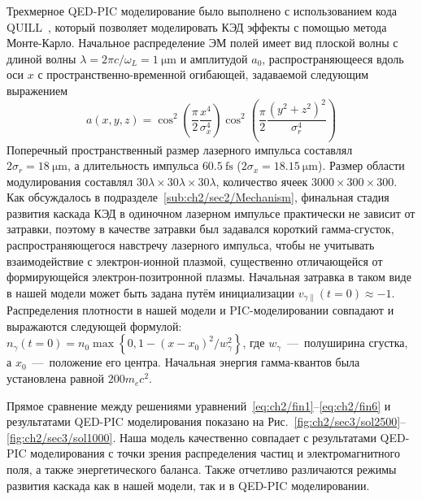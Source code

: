 Трехмерное QED-PIC моделирование было выполнено с использованием кода QUILL~\cite{QUILL}, который позволяет моделировать КЭД эффекты с помощью метода Монте-Карло.
Начальное распределение ЭМ полей имеет вид плоской волны с длиной волны $\lambda=2\pi c/\omega_{L}=\SI{1}{\um}$ и амплитудой $a_0 $, распространяющееся вдоль оси $x$ с пространственно-временной огибающей, задаваемой следующим выражением
\begin{equation}
a(x,y,z) =  \cos^2 \left( \frac{ \pi }{2}   \frac{x^4}{\sigma_x^4 } \right) \cos^2 \left( \frac{ \pi}{2}   \frac{\left( y^2 + z^2 \right)^2}{\sigma_r^4 } \right)
\end{equation}
Поперечный пространственный размер лазерного импульса составлял $2\sigma_r = \SI{18}{\um}$, а длительность импульса $\SI{60.5}{\femto\second}$ ($2\sigma_x = \SI{18.15}{\um}$).
Размер области модулирования составлял $30\lambda\times 30\lambda\times 30\lambda$, количество ячеек $3000\times 300\times 300$.
Как обсуждалось в подразделе~\ref{sub:ch2/sec2/Mechanism}, финальная стадия развития каскада КЭД в одиночном лазерном импульсе практически не зависит от затравки, поэтому в качестве затравки был задавался короткий гамма-сгусток, распространяющегося навстречу лазерного импульса, чтобы не учитывать взаимодействие с электрон-ионной плазмой, существенно отличающейся от формирующейся электрон-позитронной плазмы.
Начальная затравка в таком виде в нашей модели может быть задана путём инициализации $v_{\gamma\parallel}(t=0)\approx-1$.
Распределения плотности в нашей модели и PIC-моделировании совпадают и выражаются следующей формулой: $n_\gamma(t=0)=n_0\max\left\{0, 1 - (x-x_0)^2/w_\gamma ^2 \right\}$, где $w_\gamma$~---~полуширина сгустка, а $x_0$~---~положение его центра.
Начальная энергия гамма-квантов была установлена равной $200 m_e c^2$.


Прямое сравнение между решениями уравнений~\eqref{eq:ch2/fin1}--\eqref{eq:ch2/fin6} и результатами QED-PIC моделирования показано на Рис.~\ref{fig:ch2/sec3/sol2500}--\ref{fig:ch2/sec3/sol1000}.
Наша модель качественно совпадает с результатами QED-PIC моделирования с точки зрения распределения частиц и электромагнитного поля, а также энергетического баланса.
Также отчетливо различаются режимы развития каскада как в нашей модели, так и в QED-PIC моделировании.

